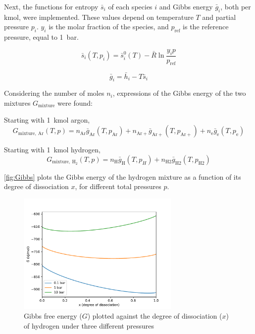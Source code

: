         Next, the functions for entropy $\bar s_i$ of each species $i$ and Gibbs energy $\bar g_i$, both per \unit{kmol}, were implemented. These values depend on temperature $T$ and partial pressure $p_i$. $y_i$ is the molar fraction of the species, and $p_\mathrm{ref}$ is the reference pressure, equal to \qty{1}{bar}.
        
        \begin{equation}
            \bar s_i (T, p_i) = \bar s_i^0 (T) - \bar R \ln \frac{y_i p}{p_\mathrm{ref}}
        \end{equation}

        \begin{equation}
            \bar g_i = \bar h_i - T \bar s_i
        \end{equation}

        Considering the number of moles $n_i$, expressions of the Gibbs energy of the two mixtures $G_\mathrm{mixture}$ were found:

        Starting with \qty{1}{kmol} argon,
        \begin{equation}
            G_\mathrm{mixture,\: Ar}(T, p) = n_\mathrm{Ar} \bar g_\mathrm{Ar}(T, p_\mathrm{Ar}) + n_\mathrm{Ar+} \bar g_\mathrm{Ar+}(T, p_\mathrm{Ar+}) + n_\mathrm{e} \bar g_\mathrm{e}(T, p_\mathrm{e})
        \end{equation}

        Starting with \qty{1}{kmol} hydrogen,
        \begin{equation}
            G_\mathrm{mixture,\: H_2}(T, p) = n_\mathrm{H} \bar g_\mathrm{H}(T, p_H) + n_\mathrm{H2} \bar g_\mathrm{H2}(T, p_\mathrm{H2})
        \end{equation}

        \autoref{fig:Gibbs} plots the Gibbs energy of the hydrogen mixture as a function of its degree of dissociation $x$, for different total pressures $p$.

        \begin{figure}[!ht]
            \centering
            \includegraphics[width=0.7\textwidth]{assets/2 models/Gibbs.pdf}
            \caption{Gibbs free energy ($G$) plotted against the degree of dissociation ($x$) of hydrogen under three different pressures}
            \label{fig:Gibbs}
        \end{figure}

